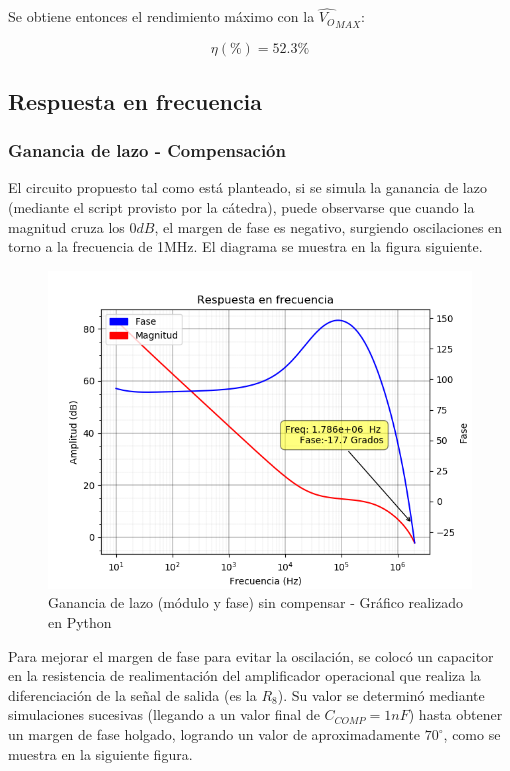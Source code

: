 Se obtiene entonces el rendimiento máximo con la $\hat{V_O}_{MAX}$:

\[
\eta(\%) = 52.3\%
\]

\subsection{Respuesta en frecuencia}

\subsubsection{Ganancia de lazo - Compensación}

El circuito propuesto tal como está planteado, si se simula la ganancia de lazo (mediante el script provisto por la cátedra), puede observarse que cuando la magnitud cruza los $0dB$, el margen de fase es negativo, surgiendo oscilaciones en torno a la frecuencia de 1MHz. El diagrama se muestra en la figura siguiente.

\begin{figure}[!ht]
\begin{centering}
\includegraphics[scale=0.45]{Imagenes/LazoSinCompenzar.png}
\par\end{centering}
\caption{Ganancia de lazo (módulo y fase) sin compensar - Gráfico realizado en Python}
\end{figure}

Para mejorar el margen de fase para evitar la oscilación, se colocó un capacitor en la resistencia de realimentación del amplificador operacional que realiza la diferenciación de la señal de salida (es la $R_8$). Su valor se determinó mediante simulaciones sucesivas (llegando a un valor final de $C_{COMP} = 1nF$) hasta obtener un margen de fase holgado, logrando un valor de aproximadamente $70^{\circ}$, como se muestra en la siguiente figura.

